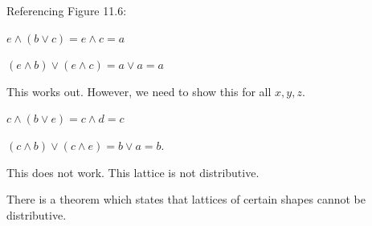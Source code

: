\documentclass[twoside]{article}
\begin{document}
Referencing Figure 11.6:

$e \wedge (b \vee c) = e \wedge c = a$

$(e \wedge b) \vee (e \wedge c) = a \vee a = a$

\vspace{.2cm}
This works out. However, we need to show this for all $x,y,z$.

\vspace{.2cm}
$c \wedge (b \vee e) = c \wedge d = c$

$(c \wedge b) \vee (c \wedge e) = b \vee a = b$.

\vspace{.2cm}
This does not work. This lattice is not distributive.
\vspace{.2cm}

There is a theorem which states that lattices of certain shapes cannot be distributive.
\end{document}
